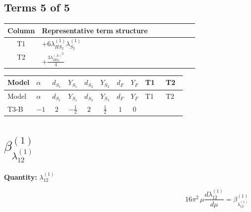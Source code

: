 \documentclass[8pt]{article}
\begin{document}
\begin{landscape}
\subsection*{Terms 5 of 5}
\begin{center}
\begin{tabular}{@{}c >{\raggedright\arraybackslash}p{0.82\linewidth}@{}}
\toprule
Column & Representative term structure \\
\midrule
T1 & \(\displaystyle +6 {\lambda_{HS_2}^{(1)}} {\lambda_{S_2}^{(1)}}\) \\
\midrule
T2 & \(\displaystyle +\frac{3 {\lambda_{HS_2}^{(A)}}^2}{4}\) \\
\midrule
\bottomrule
\end{tabular}
\end{center}
\smallskip
\tiny
\begin{longtable}{@{}llcccccc >{\raggedright\arraybackslash}p{0.21\linewidth} >{\raggedright\arraybackslash}p{0.21\linewidth}@{}}
\toprule
Model & $\alpha$ & $d_{S_1}$ & $Y_{S_1}$ & $d_{S_2}$ & $Y_{S_2}$ & $d_F$ & $Y_F$ & T1 & T2 \\
\midrule
\endfirsthead
\toprule
Model & $\alpha$ & $d_{S_1}$ & $Y_{S_1}$ & $d_{S_2}$ & $Y_{S_2}$ & $d_F$ & $Y_F$ & T1 & T2 \\
\midrule
\endhead
T3-B & $-1$ & $2$ & $-\frac{1}{2}$ & $2$ & $\frac{1}{2}$ & $1$ & $0$ & \scriptsize\adjustbox{max width=\linewidth}{$\begin{gathered} +6 {\lambda_{HS_2}^{(1)}} {\lambda_{S_2}^{(1)}}\end{gathered}$} & \scriptsize\adjustbox{max width=\linewidth}{$\begin{gathered} +\frac{3 {\lambda_{HS_2}^{(A)}}^2}{4}\end{gathered}$} \\
\midrule
\bottomrule
\end{longtable}
\clearpage
\section*{$\beta_{\lambda_{12}^{(1)}}^{(1)}$}
\noindent\textbf{Quantity: }$\lambda_{12}^{(1)}$\par\smallskip
\[16\pi^2\,\mu\frac{d \lambda_{12}^{(1)}}{d\mu}=\beta_{\lambda_{12}^{(1)}}^{(1)}\]

\end{landscape}
\end{document}
